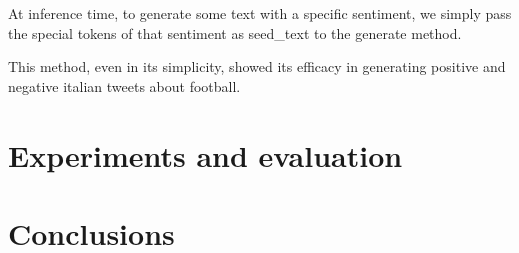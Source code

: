 \documentclass[10pt,twocolumn,letterpaper]{article}
\begin{document}
At inference time, to generate some text with a specific sentiment,
we simply pass the special tokens of that sentiment as seed\_text to the
generate method.

This method, even in its simplicity, showed its efficacy in generating positive
and negative italian tweets about football.

\section{Experiments and evaluation}

\section{Conclusions}



\end{document}
